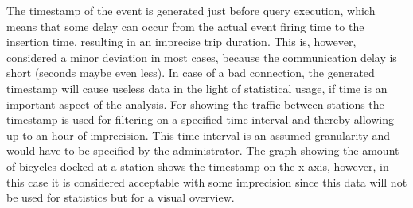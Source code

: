 The timestamp of the event is generated just before query execution, which means that some delay can occur from the actual event firing time to the insertion time, resulting in an imprecise trip duration. 
This is, however, considered a minor deviation in most cases, because the communication delay is short (seconds maybe even less).
In case of a bad connection, the generated timestamp will cause useless data in the light of statistical usage, if time is an important aspect of the analysis.
For showing the traffic between stations the timestamp is used for filtering on a specified time interval and thereby allowing up to an hour of imprecision.
This time interval is an assumed granularity and would have to be specified by the administrator.
The graph showing the amount of bicycles docked at a station shows the timestamp on the x-axis, however, in this case it is considered acceptable with some imprecision since this data will not be used for statistics but for a visual overview.